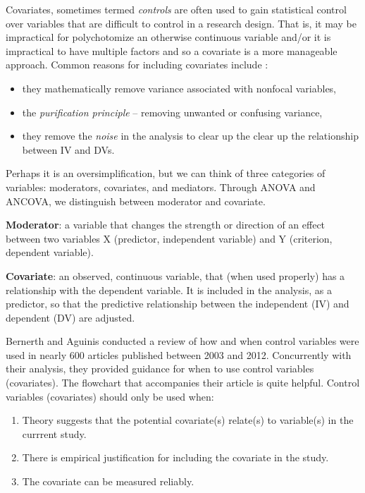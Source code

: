 \documentclass[
  11pt,
]{book}
\providecommand{\tightlist}{%
  \setlength{\itemsep}{0pt}\setlength{\parskip}{0pt}}
\begin{document}
Covariates, sometimes termed \emph{controls} are often used to gain statistical control over variables that are difficult to control in a research design. That is, it may be impractical for polychotomize an otherwise continuous variable and/or it is impractical to have multiple factors and so a covariate is a more manageable approach. Common reasons for including covariates include \citep{bernerth_critical_2016}:

\begin{itemize}
\tightlist
\item
  they mathematically remove variance associated with nonfocal variables,
\item
  the \emph{purification principle} -- removing unwanted or confusing variance,
\item
  they remove the \emph{noise} in the analysis to clear up the clear up the relationship between IV and DVs.
\end{itemize}

Perhaps it is an oversimplification, but we can think of three categories of variables: moderators, covariates, and mediators. Through ANOVA and ANCOVA, we distinguish between moderator and covariate.

\textbf{Moderator}: a variable that changes the strength or direction of an effect between two variables X (predictor, independent variable) and Y (criterion, dependent variable).

\textbf{Covariate}: an observed, continuous variable, that (when used properly) has a relationship with the dependent variable. It is included in the analysis, as a predictor, so that the predictive relationship between the independent (IV) and dependent (DV) are adjusted.

Bernerth and Aguinis \citeyearpar{bernerth_critical_2016} conducted a review of how and when control variables were used in nearly 600 articles published between 2003 and 2012. Concurrently with their analysis, they provided guidance for when to use control variables (covariates). The flowchart that accompanies their article is quite helpful. Control variables (covariates) should only be used when:

\begin{enumerate}
\def\labelenumi{\arabic{enumi}.}
\tightlist
\item
  Theory suggests that the potential covariate(s) relate(s) to variable(s) in the currrent study.
\item
  There is empirical justification for including the covariate in the study.
\item
  The covariate can be measured reliably.
\end{enumerate}
\end{document}
